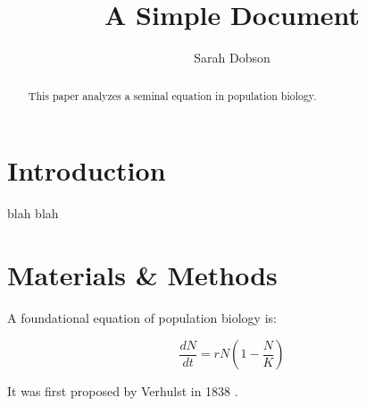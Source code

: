 \documentclass[12pt]{article}
\title{A Simple Document}
\author{Sarah Dobson}
\date{}
\begin{document}
   \maketitle
   \begin{abstract}
   This paper analyzes a seminal equation in population biology.
   \end{abstract}

   \section {Introduction}
   blah blah

   \section{Materials \& Methods}

   A foundational equation of population biology is:

   \begin{equation}
      \frac{dN}{dt} = r N (1 - \frac{N}{K})
    \end{equation}

 It was first proposed by Verhulst in 1838 \cite{verhulst1838notice}.

 

 

 
\end{document}
